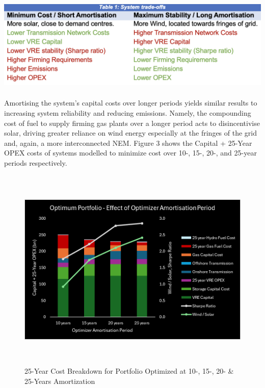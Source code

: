 \documentclass[
  letterpaper,
  DIV=11,
  numbers=noendperiod]{scrartcl}
\begin{document}
\includegraphics[width=6.26806in,height=1.8in]{./media/media/image7.png}

Amortising the system's capital costs over longer periods yields similar
results to increasing system reliability and reducing emissions. Namely,
the compounding cost of fuel to supply firming gas plants over a longer
period acts to disincentivise solar, driving greater reliance on wind
energy especially at the fringes of the grid and, again, a more
interconnected NEM. Figure 3 shows the Capital + 25-Year OPEX costs of
systems modelled to minimize cost over 10-, 15-, 20-, and 25-year
periods respectively.

\begin{figure}[H]

{\centering \includegraphics[width=5.94028in,height=3.85347in]{./media/media/image8.png}

}

\caption[25-Year Cost Breakdown for Portfolio Optimized at 10-, 15-, 20-
\& 25-Years Amortization]{25-Year Cost Breakdown for Portfolio Optimized at 10-, 15-, 20-
\& 25-Years Amortization\footnotemark{}}

\end{figure}%
\end{document}
